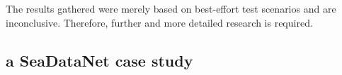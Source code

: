 \documentclass[conference]{IEEEtran}
\begin{document}
The results gathered were merely based on best-effort test scenarios and are inconclusive. Therefore, further and more detailed research is required.

\subsection{a SeaDataNet case study} %

\end{document}
